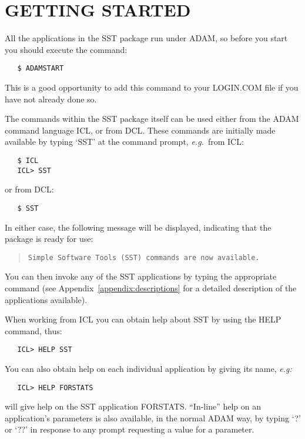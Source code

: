 \documentclass[twoside,11pt]{article}
\renewcommand{\_}{\texttt{\symbol{95}}}
\begin{document}
\section{GETTING STARTED}

All the applications in the SST package run under ADAM, so before you start
you should execute the command:

\begin{verbatim}
   $ ADAMSTART
\end{verbatim}

This is a good opportunity to add this command to your LOGIN.COM file if you
have not already done so.

The commands within the SST package itself can be used either from the ADAM
command language ICL, or from DCL.
These commands are initially made available by typing `SST' at the command
prompt, {\em e.g.}\ from ICL:

\begin{verbatim}
   $ ICL
   ICL> SST
\end{verbatim}

or from DCL:

\begin{verbatim}
   $ SST
\end{verbatim}

In either case, the following message will be displayed, indicating that the
package is ready for use:

\begin{quote}
{\tt Simple Software Tools (SST) commands are now available.}
\end{quote}

You can then invoke any of the SST applications by typing the appropriate
command (see Appendix~\ref{appendix:descriptions} for a detailed description
of the applications available).

When working from ICL you can obtain help about SST by using the HELP command,
thus:

\begin{verbatim}
   ICL> HELP SST
\end{verbatim}

You can also obtain help on each individual application by giving its name,
{\em e.g:}

\begin{verbatim}
   ICL> HELP FORSTATS
\end{verbatim}

will give help on the SST application FORSTATS.
``In-line'' help on an application's parameters is also available, in the
normal ADAM way, by typing `?' or `??' in response to any prompt requesting a
value for a parameter.
\end{document}
